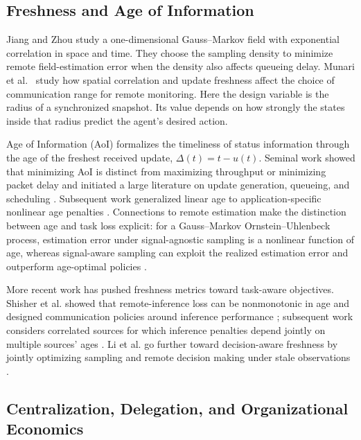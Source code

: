 \documentclass[11pt]{article}
\begin{document}
\subsection{Freshness and Age of Information}
\label{subsec:related_aoi}

Jiang and Zhou \cite{jiang2019status} study a one-dimensional
Gauss--Markov field with exponential correlation in space and time.
They choose the sampling density to minimize remote field-estimation
error when the density also affects queueing delay.
Munari et al.~\cite{munari2025spatiotemporal} study how spatial
correlation and update freshness affect the choice of communication
range for remote monitoring. Here the design variable is the radius
of a synchronized snapshot. Its value depends on how strongly the
states inside that radius predict the agent's desired action.

Age of Information (AoI) formalizes the timeliness of status information through the age of the freshest received update, $\Delta(t)=t-u(t)$. Seminal work showed that minimizing AoI is distinct from maximizing throughput or minimizing packet delay and initiated a large literature on update generation, queueing, and scheduling \cite{kaul2012realtime,yates2021aoi}. Subsequent work generalized linear age to application-specific nonlinear age penalties \cite{sun2017update}. Connections to remote estimation make the distinction between age and task loss explicit: for a Gauss--Markov Ornstein--Uhlenbeck process, estimation error under signal-agnostic sampling is a nonlinear function of age, whereas signal-aware sampling can exploit the realized estimation error and outperform age-optimal policies \cite{ornee2021ou}.

More recent work has pushed freshness metrics toward task-aware objectives. Shisher et al. showed that remote-inference loss can be nonmonotonic in age and designed communication policies around inference performance \cite{shisher2024timely}; subsequent work considers correlated sources for which inference penalties depend jointly on multiple sources' ages \cite{shisher2026correlated}. Li et al. go further toward decision-aware freshness by jointly optimizing sampling and remote decision making under stale observations \cite{li2026freshness}.

\subsection{Centralization, Delegation, and Organizational Economics}
\end{document}
